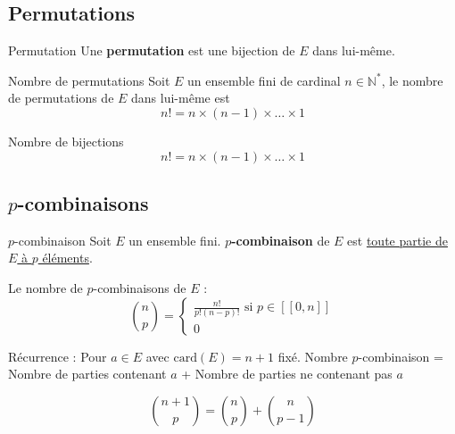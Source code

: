 
\subsection{Permutations} %
\begin{Definition}[colbacktitle=red!75!black]{Permutation}{}
Une \textbf{permutation} est une bijection de $E$ dans lui-même.
\end{Definition}

\begin{Theorem}{Nombre de permutations}{}
Soit $E$ un ensemble fini de cardinal $n \in \mathbb{N} ^{*}$, 
le nombre de permutations de $E$ dans lui-même est 
\begin{equation}
  n! = n \times (n-1) \times \dots \times 1
\end{equation}
\end{Theorem}


\begin{Theorem}{Nombre de bijections}{}
\begin{equation}
  n! = n \times (n-1) \times \dots \times 1
\end{equation}
\end{Theorem}





\subsection{$p$-combinaisons} %
\label{sub:$p$-combinaisons}

\begin{Definition}[colbacktitle=red!75!black]{$p$-combinaison}{}
Soit $E$ un ensemble fini. \textbf{$p$-combinaison} de $E$ est \underline{toute partie de $E$ à $p$ éléments}.
\end{Definition}

\begin{Theorem}{}{}
Le nombre de $p$-combinaisons de $E$ : 
\begin{equation}
  \binom{n}{p} = \begin{cases}
    \frac{n!}{p!(n-p)!} \text{ si } p \in [\![0, n]\!] \\
    0
  \end{cases}
\end{equation}
\end{Theorem}

\begin{myproof}{}{}
Récurrence : Pour $a \in E$ avec $\mathrm{card}(E) = n+1$ fixé. Nombre $p$-combinaison = Nombre de parties contenant $a$ + Nombre de parties ne contenant pas $a$

\begin{equation}
  \binom{n+1}{p} = \binom{n}{p} + \binom{n}{p-1}
\end{equation}
\end{myproof}


